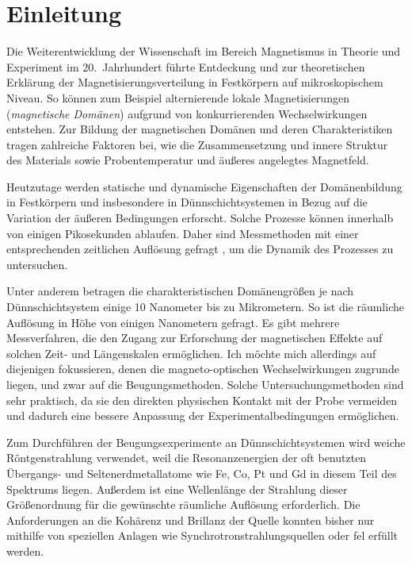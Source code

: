 \chapter{Einleitung}
\label{text:einleitung}
Die Weiterentwicklung der Wissenschaft im Bereich Magnetismus in Theorie und Experiment im 20.\ Jahrhundert führte Entdeckung und zur theoretischen Erklärung der Magnetisierungsverteilung in Festkörpern auf mikroskopischem Niveau. So können zum Beispiel alternierende lokale Magnetisierungen (\emph{magnetische Domänen}) aufgrund von konkurrierenden Wechselwirkungen entstehen. Zur Bildung der magnetischen Domänen und deren Charakteristiken tragen zahlreiche Faktoren bei, wie die Zusammensetzung und innere Struktur des Materials sowie Probentemperatur und äußeres angelegtes Magnetfeld.

\noindent
Heutzutage werden statische und dynamische Eigenschaften der Domänenbildung in Festkörpern und insbesondere in Dünnschichtsystemen in Bezug auf die Variation der äußeren Bedingungen erforscht. Solche Prozesse können innerhalb von einigen Pikosekunden ablaufen. Daher sind Messmethoden mit einer entsprechenden zeitlichen Auflösung gefragt \cite{pfau_ultrafast_2012}, um die Dynamik des Prozesses zu untersuchen.

\noindent
Unter anderem betragen die charakteristischen Domänengrößen je nach Dünnschichtsystem einige 10 Nanometer bis zu Mikrometern. So ist die räumliche Auflösung in Höhe von einigen Nanometern gefragt. Es gibt mehrere Messverfahren, die den Zugang zur Erforschung der magnetischen Effekte auf solchen Zeit- und Längenskalen ermöglichen. Ich möchte mich allerdings auf diejenigen fokussieren, denen die magneto-optischen Wechselwirkungen zugrunde liegen, und zwar auf die Beugungsmethoden. Solche Untersuchungsmethoden sind sehr praktisch, da sie den direkten physischen Kontakt mit der Probe vermeiden und dadurch eine bessere Anpassung der Experimentalbedingungen ermöglichen.

\noindent
Zum Durchführen der Beugungsexperimente an Dünnschichtsystemen wird weiche Röntgenstrahlung verwendet, weil die Resonanzenergien der oft benutzten Übergangs- und Seltenerdmetallatome wie Fe, Co, Pt und Gd in diesem Teil des Spektrums liegen. Außerdem ist eine Wellenlänge der Strahlung dieser Größenordnung für die gewünschte räumliche Auflösung erforderlich. Die Anforderungen an die Kohärenz und Brillanz der Quelle konnten bisher nur mithilfe von speziellen Anlagen wie Synchrotronstrahlungsquellen oder \gls{fel} erfüllt werden.

